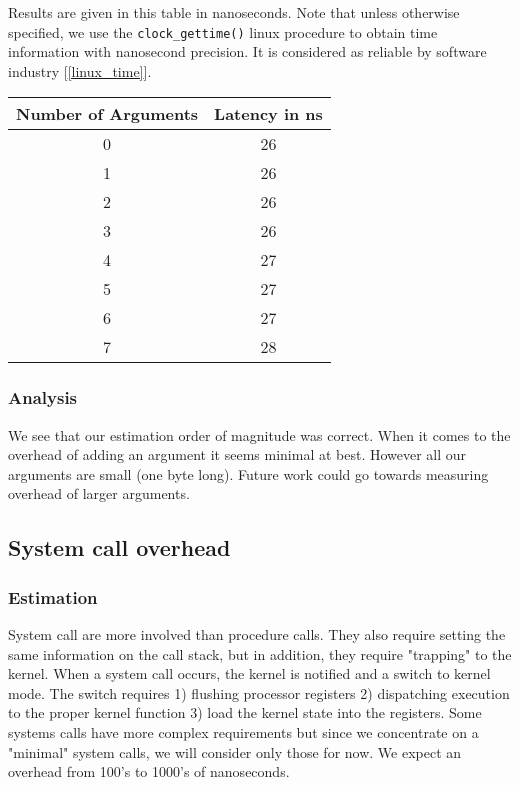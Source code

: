 Results are given in this table in nanoseconds. Note that unless otherwise specified, we
use the \texttt{clock\_gettime()} linux procedure to obtain time information with nanosecond
precision. It is considered as reliable by software industry [\ref{linux_time}].

\begin{center}
\begin{tabular}{| c | c | }
\hline 
Number of Arguments & Latency in ns \\
\hline
0 & 26 \\
1 & 26 \\
2 & 26 \\
3 & 26 \\
4 & 27 \\
5 & 27 \\
6 & 27 \\
7 & 28 \\
\hline
\end{tabular}
\end{center}

\subsubsection{Analysis}

We see that our estimation order of magnitude was correct. When it comes to the overhead of adding
an argument it seems minimal at best. However all our arguments are small (one byte long). 
Future work could go towards measuring overhead of larger arguments.

\subsection{System call overhead}

\subsubsection{Estimation}

System call are more involved than procedure calls. They also require setting the same information on the call stack,
but in addition, they require "trapping" to the kernel. When a system call occurs, the kernel is notified and a switch
to kernel mode. The switch requires 1) flushing processor registers 2) dispatching execution
to the proper kernel function 3) load the kernel state into the registers. Some systems calls have more complex requirements
but since we concentrate on a "minimal" system calls, we will consider only those for now. We expect an
overhead from 100's to 1000's of nanoseconds.

